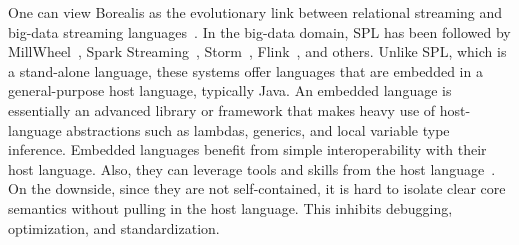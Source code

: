 One can
view Borealis as the evolutionary link between relational streaming
and big-data streaming languages~\cite{abadi_et_al_2005}.
In the big-data domain, SPL has been followed by
\textsf{MillWheel}~\cite{akidau_et_al_2013}, \textsf{Spark
Streaming}~\cite{zaharia_et_al_2013},
\textsf{Storm}~\cite{toshniwal_et_al_2014}, \textsf{Flink}~\cite{carbone_et_al_2015},
and others.  Unlike SPL, which is a stand-alone language, these
systems offer languages that are embedded in a general-purpose host
language, typically Java. An embedded language is essentially an
advanced library or framework that makes heavy use of host-language
abstractions such as lambdas, generics, and local variable type
inference. Embedded languages benefit from simple interoperability
with their host language. Also, they can leverage tools and skills
from the host language~\cite{hudak_1998}. On the downside, since they
are not self-contained, it is hard to isolate clear core semantics
without pulling in the host language. This inhibits debugging,
optimization, and standardization.
